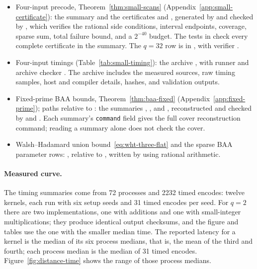 \begin{itemize}
  .
\item Four-input precode, Theorem~\ref{thm:small-scans}
  (Appendix~\ref{app:small-certificate}): the summary
   and the certificates
   and
  , generated by
   and checked by ,
  which verifies the rational side conditions, interval endpoints,
  coverage, sparse sum, total failure bound, and a $2^{-40}$ budget.
  The tests in  check every complete
  certificate in the summary. The $q=32$ row is in
  , with verifier
  .
\item Four-input timings (Table~\ref{tab:small-timing}): the archive
  , with runner
   and archive checker
  . The archive includes the
  measured sources, raw timing samples, host and compiler details,
  hashes, and validation outputs.
\item Fixed-prime BAA bounds, Theorem~\ref{thm:baa-fixed}
  (Appendix~\ref{app:fixed-prime}); paths relative to
  : the summaries
  ,
  , and
  ,
  reconstructed and checked by
   and
  . Each summary's
  \texttt{command} field gives the full cover reconstruction command;
  reading a summary alone does not check the cover.
\item Walsh--Hadamard union bound~\eqref{eq:wht-three-flat} and the
  sparse BAA parameter rows: ,
  relative to , written by
   using rational arithmetic.
\end{itemize}

\paragraph{Measured curve.}
The timing summaries come from 72 processes and 2232 timed encodes:
twelve kernels, each run with six setup seeds and 31 timed encodes per
seed. For $q=2$ there are two implementations, one with additions and
one with small-integer multiplications; they produce identical output
checksums, and the figure and tables use the one with the smaller
median time. The reported latency for a kernel is the median of its
six process medians, that is, the mean of the third and fourth; each
process median is the median of 31 timed encodes.
Figure~\ref{fig:distance-time} shows the range of those process medians.

